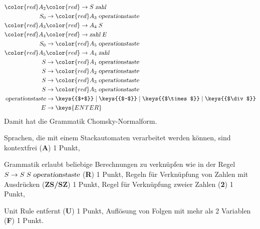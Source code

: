 \begin{loesung}
\begin{teilaufgaben}
\begin{align*}
\color{red}A_2&\color{red}\rightarrow S \; \textsl{zahl}
\\
S_0&\rightarrow {\color{red}A_3} \; \textsl{operationstaste}
\\
\color{red}A_3&\color{red}\rightarrow A_4 \; S
\\
\color{red}A_4&\color{red}\rightarrow \textsl{zahl} \; E
\\
S_0&\rightarrow {\color{red}A_5} \; \textsl{operationstaste}
\\
\color{red}A_5&\color{red}\rightarrow A_4 \; \textsl{zahl}
\\
S&\rightarrow {\color{red}A_1} \; \textsl{operationstaste}
\\
S&\rightarrow {\color{red}A_2} \; \textsl{operationstaste}
\\
S&\rightarrow {\color{red}A_3} \;\textsl{operationstaste}
\\
S&\rightarrow {\color{red}A_5} \; \textsl{operationstaste}
\\
\textsl{operationstaste}&\rightarrow
\keys{{$+$}}
\;|\;
\keys{{$-$}}
\;|\;
\keys{{$\times$}}
\;|\;
\keys{{$\div$}}
\\
E&\rightarrow\keys{ENTER}
\end{align*}
Damit hat die Grammatik Chomsky-Normalform.
\qedhere
\end{teilaufgaben}
\end{loesung}

\begin{bewertung}
\begin{teilaufgaben}
\item
Sprachen, die mit einem Stackautomaten verarbeitet werden können, sind
kontextfrei ({\bf A}) 1 Punkt,
\item
Grammatik erlaubt beliebige Berechnungen zu verknüpfen wie in der
Regel $S\to S\;S\;\textsl{operationstaste}$ ({\bf R}) 1 Punkt,
Regeln für Verknüpfung von Zahlen mit Ausdrücken ({\bf ZS/SZ}) 1 Punkt,
Regel für Verknüpfung zweier Zahlen ({\bf 2}) 1 Punkt,
\item
Unit Rule entfernt ({\bf U}) 1 Punkt, Auflösung von Folgen mit mehr
als 2 Variablen ({\bf F}) 1 Punkt.
\end{teilaufgaben}
\end{bewertung}

